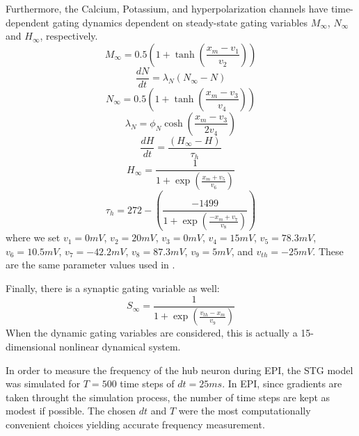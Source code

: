 \documentclass[11pt]{article}
\begin{document}
Furthermore, the Calcium, Potassium, and hyperpolarization channels have time-dependent gating dynamics dependent on steady-state gating variables $M_\infty$, $N_\infty$ and $H_\infty$, respectively.
\begin{equation}  M_{\infty} = 0.5 \left( 1 + \tanh \left( \frac{x_m - v_1}{v_2} \right) \right) \end{equation}
\begin{equation}  \frac{dN}{dt} = \lambda_N (N_\infty - N)  \end{equation}
\begin{equation}  N_\infty = 0.5 \left( 1 + \tanh \left( \frac{x_m - v_3}{v_4} \right) \right) \end{equation}
\begin{equation}  \lambda_N = \phi_N \cosh \left( \frac{x_m - v_3}{2 v_4} \right) \end{equation}
\begin{equation}  \frac{dH}{dt} = \frac{\left( H_\infty - H \right)}{\tau_h} \end{equation}
\begin{equation}  H_\infty = \frac{1}{1 + \exp \left( \frac{x_m + v_5}{v_6} \right)} \end{equation}
\begin{equation}  \tau_h = 272 - \left( \frac{-1499}{1 + \exp \left( \frac{-x_m + v_7}{v_8} \right)} \right) \end{equation}
where we set $v_1 = 0mV$, $v_2  = 20mV$, $v_3 = 0mV$, $v_4 = 15mV$, $v_5 = 78.3mV$,
$v_6 = 10.5mV$, $v_7 = -42.2mV$, $v_8 = 87.3mV$, $v_9 = 5mV$, and $v_{th} = -25mV$.  These are the same parameter values used in \cite{gutierrez2013multiple}.

Finally, there is a synaptic gating variable as well:
\begin{equation} S_\infty = \frac{1}{1 + \exp \left( \frac{v_{th} - x_m}{v_9} \right)} 
\end{equation}
When the dynamic gating variables are considered, this is actually a 15-dimensional nonlinear dynamical system.

In order to measure the frequency of the hub neuron during EPI, the STG model was simulated for $T = 500$ time steps of $dt = 25ms$.  In EPI, since gradients are taken throught the simulation process, the number of time steps are kept as modest if possible. The chosen $dt$ and $T$ were the most computationally convenient choices yielding accurate frequency measurement.
\end{document}
